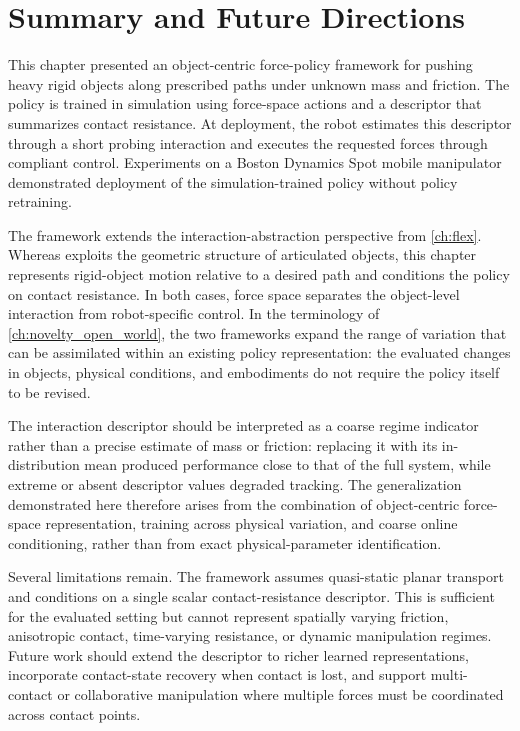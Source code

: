 \section{Summary and Future Directions}
\label{sec:pho_summary}

This chapter presented an object-centric force-policy framework for pushing heavy rigid objects along prescribed paths under unknown mass and friction. The policy is trained in simulation using force-space actions and a descriptor that summarizes contact resistance. At deployment, the robot estimates this descriptor through a short probing interaction and executes the requested forces through compliant control. Experiments on a Boston Dynamics Spot mobile manipulator demonstrated deployment of the simulation-trained policy without policy retraining.

The framework extends the interaction-abstraction perspective from \cref{ch:flex}. Whereas \FLEX{} exploits the geometric structure of articulated objects, this chapter represents rigid-object motion relative to a desired path and conditions the policy on contact resistance. In both cases, force space separates the object-level interaction from robot-specific control. In the terminology of \cref{ch:novelty_open_world}, the two frameworks expand the range of variation that can be assimilated within an existing policy representation: the evaluated changes in objects, physical conditions, and embodiments do not require the policy itself to be revised.

The interaction descriptor should be interpreted as a coarse regime indicator rather than a precise estimate of mass or friction: replacing it with its in-distribution mean produced performance close to that of the full system, while extreme or absent descriptor values degraded tracking. The generalization demonstrated here therefore arises from the combination of object-centric force-space representation, training across physical variation, and coarse online conditioning, rather than from exact physical-parameter identification.

Several limitations remain. The framework assumes quasi-static planar transport and conditions on a single scalar contact-resistance descriptor. This is sufficient for the evaluated setting but cannot represent spatially varying friction, anisotropic contact, time-varying resistance, or dynamic manipulation regimes. Future work should extend the descriptor to richer learned representations, incorporate contact-state recovery when contact is lost, and support multi-contact or collaborative manipulation where multiple forces must be coordinated across contact points.

